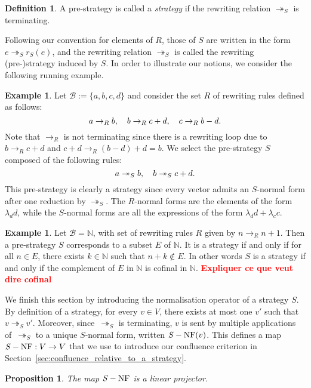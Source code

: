 \documentclass[10pt]{easychair}
\newtheorem{proposition}[theorem]{Proposition}
\theoremstyle{definition}
\newtheorem{definition}[theorem]{Definition}
\newtheorem{example}[theorem]{Example}
\newcommand\todo[1]{{\bf\textcolor{red}{#1}}}
\newcommand\basis{\mathscr{B}}
\newcommand\rewR{\to_R}
\newcommand\rewS{\twoheadrightarrow_S}
\DeclareMathOperator{\SNF}{{\it S}-NF}
\begin{document}
\begin{definition}
  A pre-strategy is called a {\em strategy} if the rewriting relation
  $\rewS$ is terminating. 
\end{definition}
\smallskip

Following our convention for elements of $R$, those of $S$ are written in
the form $e\rewS r_S(e)$, and the rewriting relation $\rewS$ is called
the rewriting (pre-)strategy induced by $S$. In order to illustrate our
notions, we consider the following running example.
\smallskip

\begin{example}\label{ex:h_norma_form}
  Let $\basis:=\{a,b,c,d\}$ and consider the set $R$ of rewriting rules
  defined as follows:
  \[a\rewR b,\quad b\rewR c+d,\quad c\rewR b-d.
  \smallskip\]
  Note that $\rewR$ is not terminating since there is a rewriting loop
  due to $b\rewR c+d$ and $c+d\rewR (b-d)+d=b$. We select the
  pre-strategy $S$ composed of the following rules:
  \[a\rewS b,\quad b\rewS c+d.
  \smallskip\]
  This pre-strategy is clearly a strategy since every vector admits an
  $S$-normal form after one reduction by $\rewS$. The $R$-normal forms
  are the elements of the form $\lambda_dd$, while the $S$-normal forms
  are all the expressions of the form $\lambda_dd+\lambda_cc$.
\end{example}

\begin{example}\label{ex:case_N}
  Let $\basis = \mathbb N$, with set of rewriting rules $R$ given by
  $n \rewR n+1$. Then a pre-strategy $S$ corresponds to a subset $E$ of
  $\mathbb N$. It is a strategy if and only if for all $n \in E$, there
  exists $k \in \mathbb N$ such that $n + k \notin E$. In other words $S$
  is a strategy if and only if the complement of $E$ in $\mathbb N$ is
  cofinal in $\mathbb N$. \todo{Expliquer ce que veut dire cofinal}
\end{example}
\smallskip

We finish this section by introducing the normalisation operator of a
strategy $S$. By definition of a strategy, for every $v\in V$, there
exists at most one $v'$ such that $v\rewS v'$. Moreover, since~$\rewS$ is
terminating, $v$ is sent by multiple applications of~$\rewS$ to a unique
$S$-normal form, written $\SNF(v)$. This defines a map $\SNF:V\to V$ that
we use to introduce our confluence criterion in
Section~\ref{sec:confluence_relative_to_a_strategy}.
\medskip

\begin{proposition}\label{prop:linearity_of_H}
  The map $\SNF$ is a linear projector.
\end{proposition}
\end{document}
